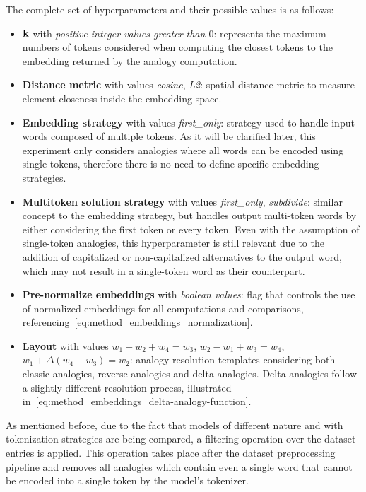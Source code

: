 The complete set of hyperparameters and their possible values is as follows:
\begin{itemize}
    \item $\bm{\mathbf{k}}$ with \emph{positive integer values greater than $0$}: represents the maximum numbers of tokens considered when computing the closest tokens to the embedding returned by the analogy computation.
    \item \textbf{Distance metric} with values \emph{cosine}, \emph{L2}: spatial distance metric to measure element closeness inside the embedding space.
    \item \textbf{Embedding strategy} with values \emph{first\_only}: strategy used to handle input words composed of multiple tokens.
As it will be clarified later, this experiment only considers analogies where all words can be encoded using single tokens, therefore there is no need to define specific embedding strategies.
    \item \textbf{Multitoken solution strategy} with values \emph{first\_only}, \emph{subdivide}: similar concept to the embedding strategy, but handles output multi-token words by either considering the first token or every token.
Even with the assumption of single-token analogies, this hyperparameter is still relevant due to the addition of capitalized or non-capitalized alternatives to the output word, which may not result in a single-token word as their counterpart.
    \item \textbf{Pre-normalize embeddings} with \emph{boolean values}: flag that controls the use of normalized embeddings for all computations and comparisons, referencing~\cref{eq:method_embeddings_normalization}.
    \item \textbf{Layout} with values $w_1 - w_2 + w_4 = w_3$, $w_2 - w_1 + w_3 = w_4$, $w_1 + \Delta(w_4 - w_3) = w_2$: analogy resolution templates considering both classic analogies, reverse analogies and delta analogies.
Delta analogies follow a slightly different resolution process, illustrated in~\cref{eq:method_embeddings_delta-analogy-function}.
\end{itemize}

As mentioned before, due to the fact that models of different nature and with  tokenization strategies are being compared, a filtering operation over the dataset entries is applied.
This operation takes place after the dataset preprocessing pipeline and removes all analogies which contain even a single word that cannot be encoded into a single token by the model's tokenizer.

